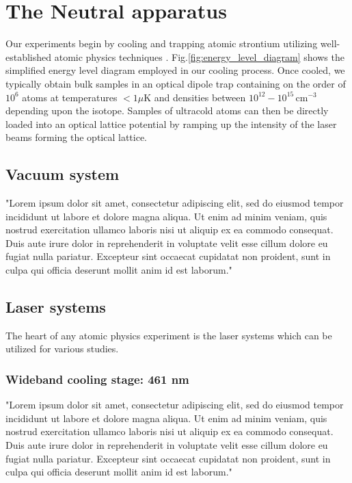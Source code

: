 \chapter{The Neutral apparatus}
\label{ch:chap2}

Our experiments begin by cooling and trapping atomic strontium utilizing well-established atomic physics techniques \cite{Metcalf1999,Katori1999,Ido2000,Nagel2003,Mukaiyama2003a,Loftus2004,DeEscobar2009a,Stellmer2009,Stellmer2010,Mickelson2010,DeSalvo2010,Tey2010a}. Fig.\;\ref{fig:energy_level_diagram} shows the simplified energy level diagram employed in our cooling process. Once cooled, we typically obtain bulk samples in an optical dipole trap containing on the order of $10^6$ atoms at temperatures $<1\mu$K and densities between $10^{12} - 10^{15}\,$cm$^{-3}$ depending upon the isotope. Samples of ultracold atoms can then be directly loaded into an optical lattice potential by ramping up the intensity of the laser beams forming the optical lattice.

\section{Vacuum system}
\label{sec:vac}

"Lorem ipsum dolor sit amet, consectetur adipiscing elit, sed do eiusmod tempor incididunt ut labore et dolore magna aliqua. Ut enim ad minim veniam, quis nostrud exercitation ullamco laboris nisi ut aliquip ex ea commodo consequat. Duis aute irure dolor in reprehenderit in voluptate velit esse cillum dolore eu fugiat nulla pariatur. Excepteur sint occaecat cupidatat non proident, sunt in culpa qui officia deserunt mollit anim id est laborum."

\section{Laser systems}
\label{sec:laser_systems}

The heart of any atomic physics experiment is the laser systems which can be utilized for various studies. 

\subsection{Wideband cooling stage: 461 nm}
\label{ssec:461sys}

"Lorem ipsum dolor sit amet, consectetur adipiscing elit, sed do eiusmod tempor incididunt ut labore et dolore magna aliqua. Ut enim ad minim veniam, quis nostrud exercitation ullamco laboris nisi ut aliquip ex ea commodo consequat. Duis aute irure dolor in reprehenderit in voluptate velit esse cillum dolore eu fugiat nulla pariatur. Excepteur sint occaecat cupidatat non proident, sunt in culpa qui officia deserunt mollit anim id est laborum."

